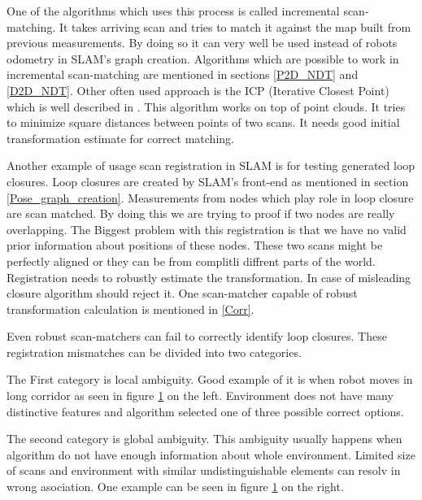 One of the algorithms which uses this process is called incremental scan-matching. It takes arriving scan and tries to match it against the map built from previous measurements. By doing so it can very well be used instead of robots odometry in SLAM's graph creation. Algorithms which are possible to work in incremental scan-matching are mentioned in sections \ref{P2D_NDT} and \ref{D2D_NDT}. Other often used approach is the ICP (Iterative Closest Point) which is well described in \cite{ICP}. This algorithm works on top of point clouds. It tries to minimize square distances between points of two scans. It needs good initial transformation estimate for correct matching. 

Another example of usage scan registration in SLAM is for testing generated loop closures. Loop closures are created by SLAM's front-end as mentioned in section \ref{Pose_graph_creation}. Measurements from nodes which play role in loop closure are scan matched. By doing this we are trying to proof if two nodes are really overlapping.  The Biggest problem with this registration is that we have no valid prior information about positions of these nodes. These two scans might be perfectly aligned or they can be from complitli diffrent parts of the world. Registration needs to robustly estimate the transformation. In case of misleading closure algorithm should reject it. One scan-matcher capable of robust transformation calculation is mentioned in \ref{Corr}.  


Even robust scan-matchers can fail to correctly identify loop closures.  These registration mismatches can be divided into two categories.

The First category is local ambiguity. Good example of it is when robot moves in long corridor as seen in figure \ref{Pic_coridor} on the left. Environment does not have many distinctive features and algorithm selected one of three possible correct options.

The second category is global ambiguity. This ambiguity usually happens when algorithm do not have enough information about whole environment. Limited size of scans and environment with similar undistinguishable elements can resolv in wrong asociation. One example can be seen in figure \ref{Pic_coridor} on the right.   
     
 \begin{figure}
 \label{Pic_coridor}

 \end{figure}

  \newpage
